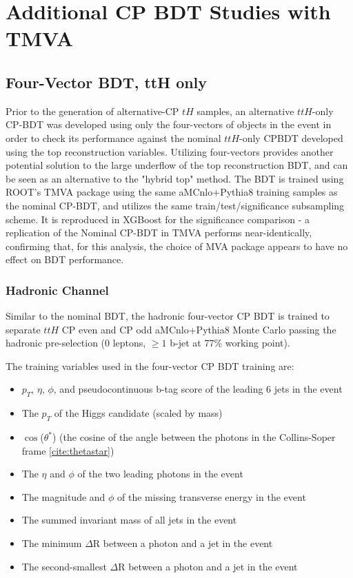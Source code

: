 \section{Additional CP BDT Studies with TMVA}
\label{sec:TMVABDTStudies}

\subsection{Four-Vector BDT, ttH only}
Prior to the generation of alternative-CP $tH$ samples, an alternative $ttH$-only CP-BDT was developed using only the four-vectors of objects in the event in order to check its performance against the nominal $ttH$-only CPBDT developed using the top reconstruction variables. Utilizing four-vectors provides another potential solution to the large underflow of the top reconstruction BDT, and can be seen as an alternative to the "hybrid top" method. The BDT is trained using ROOT's TMVA package \cite{TMVA} using the same aMCnlo+Pythia8 training samples as the nominal CP-BDT, and utilizes the same train/test/significance subsampling scheme. It is reproduced in XGBoost for the significance comparison - a replication of the Nominal CP-BDT in TMVA performs near-identically, confirming that, for this analysis, the choice of MVA package appears to have no effect on BDT performance.

\subsubsection{Hadronic Channel}

Similar to the nominal BDT, the hadronic four-vector CP BDT is trained to separate $ttH$ CP even and CP odd aMCnlo+Pythia8 Monte Carlo passing the hadronic pre-selection (0 leptons, $\ge1$ b-jet at 77\% working point).

The training variables used in the four-vector CP BDT training are:
\begin{itemize}
\item $p_{T}$, $\eta$, $\phi$, and pseudocontinuous b-tag score of the leading 6 jets in the event
\item The $p_{T}$ of the Higgs candidate (scaled by mass)
\item  $\cos$($\theta^{*}$) (the cosine of the angle between the photons in the Collins-Soper frame \ref{cite:thetastar})
\item The $\eta$ and $\phi$ of the two leading photons in the event
\item The magnitude and $\phi$ of the missing transverse energy in the event
\item The summed invariant mass of all jets in the event
\item The minimum $\Delta$R between a photon and a jet in the event
\item The second-smallest $\Delta$R between a photon and a jet in the event
\end{itemize} 

